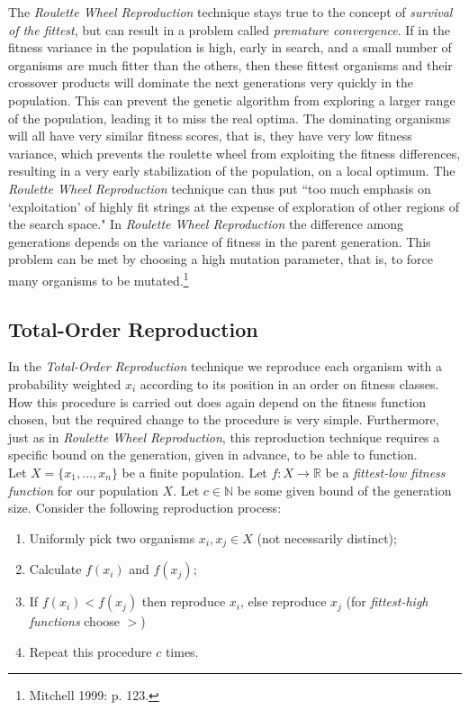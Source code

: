 \documentclass[a4paper]{article}
\theoremstyle{dotless}
\begin{document}
The \emph{Roulette Wheel Reproduction} technique stays true to the concept of \emph{survival of the fittest}, but can result in a problem called \emph{premature convergence}.  If in the fitness variance in the population is high, early in search, and a small number of organisms are much fitter than the others, then these fittest organisms and their crossover products will dominate the next generations very quickly in the population. This can prevent the genetic algorithm from exploring a larger range of the population, leading it to miss the real optima. The dominating organisms will all have very similar fitness scores, that is, they have very low fitness variance, which prevents the roulette wheel from exploiting the fitness differences, resulting in a very early stabilization of the population, on a local optimum. The \emph{Roulette Wheel Reproduction} technique can thus put ``too much emphasis on `exploitation' of highly fit strings at the expense of exploration of other regions of the search space." In \emph{Roulette Wheel Reproduction} the difference among generations depends on the variance of fitness in the parent generation. This problem can be met by choosing a high mutation parameter, that is, to force many organisms to be mutated.\footnote{Mitchell 1999: p. 123.}

\subsection{Total-Order Reproduction}

In the \textit{Total-Order Reproduction} technique we reproduce each organism with a probability weighted $x_i$ according to its position in an order on fitness classes. How this procedure is carried out does again depend on the fitness function chosen, but the required change to the procedure is very simple. Furthermore, just as in \emph{Roulette Wheel Reproduction}, this reproduction technique requires a specific bound on the generation, given in advance, to be able to function. 
\\

Let $X = \{x_1,...,x_n \}$ be a finite population. Let $f: X \rightarrow \mathbb{R}$ be a \emph{fittest-low fitness function} for our population $X$. Let $c \in \mathbb{N}$ be some given bound of the generation size. Consider the following reproduction process:

	\begin{enumerate}
	\item Uniformly pick two organisms $x_i,x_j \in X$ (not necessarily distinct);
	\item Calculate $f(x_i)$ and $f(x_j)$;
	\item If $f(x_i) < f(x_j)$ then reproduce $x_i$, else reproduce $x_j$ (for \emph{fittest-high functions} choose $>$)
	\item Repeat this procedure $c$ times.
	\end{enumerate}
	
\end{document}
